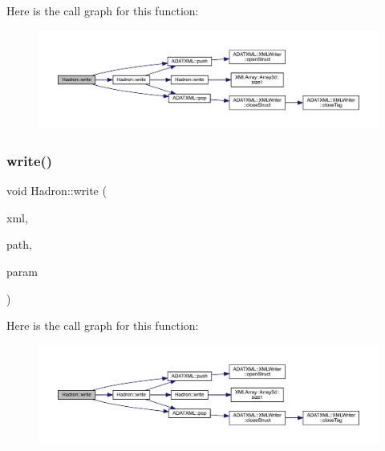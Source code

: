 Here is the call graph for this function\+:
\nopagebreak
\begin{figure}[H]
\begin{center}
\leavevmode
\includegraphics[width=350pt]{d1/daf/namespaceHadron_ac03bbcefc730bcb21021dc5c45a1b365_cgraph}
\end{center}
\end{figure}
\mbox{\label{namespaceHadron_a005000ac92ae829ca325627dae07fb51}} 
\subsubsection{\texorpdfstring{write()}{write()}\hspace{0.1cm}{\footnotesize\ttfamily [36/95]}}
{\footnotesize\ttfamily void Hadron\+::write (\begin{DoxyParamCaption}\item[{\mbox{\hyperlink{classADATXML_1_1XMLWriter}{X\+M\+L\+Writer}} \&}]{xml,  }\item[{const std\+::string \&}]{path,  }\item[{const \mbox{\hyperlink{structHadron_1_1KeyHadronNPartIrrepOp__t_1_1CGPair__t_1_1Slot__t}{Key\+Hadron\+N\+Part\+Irrep\+Op\+\_\+t\+::\+C\+G\+Pair\+\_\+t\+::\+Slot\+\_\+t}} \&}]{param }\end{DoxyParamCaption})}

Here is the call graph for this function\+:
\nopagebreak
\begin{figure}[H]
\begin{center}
\leavevmode
\includegraphics[width=350pt]{d1/daf/namespaceHadron_a005000ac92ae829ca325627dae07fb51_cgraph}
\end{center}
\end{figure}
\mbox{\label{namespaceHadron_ae38baf2d1cfe9fdaf455f274e722b32f}} 
